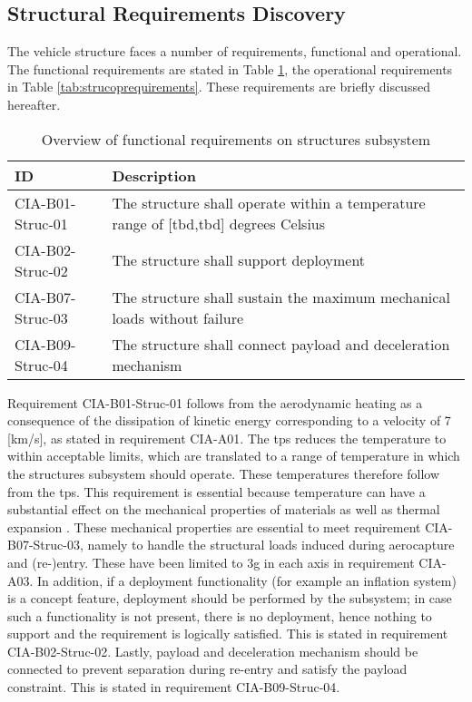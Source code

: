 \subsection{Structural Requirements Discovery} \label{sec:struct}
The vehicle structure faces a number of requirements, functional and operational. The functional requirements are stated in Table \ref{tab:strucfuncrequirements}, the operational requirements in Table \ref{tab:strucoprequirements}. These requirements are briefly discussed hereafter.
\begin{table}[H]
	\caption{Overview of functional requirements on structures subsystem}
	\begin{tabular}{|p{}|p{}|}
    \hline
    ID          & Description                                                                                                      \\ \hline \hline
    CIA-B01-Struc-01 & The structure shall operate within a temperature range of [\gls{tbd},\gls{tbd}] degrees Celsius           \\ \hline
    CIA-B02-Struc-02 & The structure shall support deployment \\ \hline
    CIA-B07-Struc-03 & The structure shall sustain the maximum mechanical loads without failure                           \\ \hline
    CIA-B09-Struc-04 & The structure shall connect payload and deceleration mechanism \\ \hline
    \end{tabular}
    \label{tab:strucfuncrequirements}
\end{table}
Requirement CIA-B01-Struc-01 follows from the aerodynamic heating as a consequence of the dissipation of kinetic energy corresponding to a velocity of 7 [km/s], as stated in requirement CIA-A01. The \gls{tps} reduces the temperature to within acceptable limits, which are translated to a range of temperature in which the structures subsystem should operate. These temperatures therefore follow from the \gls{tps}. This requirement is essential because temperature can have a substantial effect on the mechanical properties of materials as well as thermal expansion \cite{Callister2007}. These mechanical properties are essential to meet requirement CIA-B07-Struc-03, namely to handle the structural loads induced during aerocapture and (re-)entry. These have been limited to 3g in each axis in requirement CIA-A03. In addition, if a deployment functionality  (for example an inflation system) is a concept feature, deployment should be performed by the subsystem; in case such a functionality is not present, there is no deployment, hence nothing to support and the requirement is logically satisfied. This is stated in requirement CIA-B02-Struc-02. Lastly, payload and deceleration mechanism should be connected to prevent separation during re-entry and satisfy the payload constraint. This is stated in requirement CIA-B09-Struc-04.

